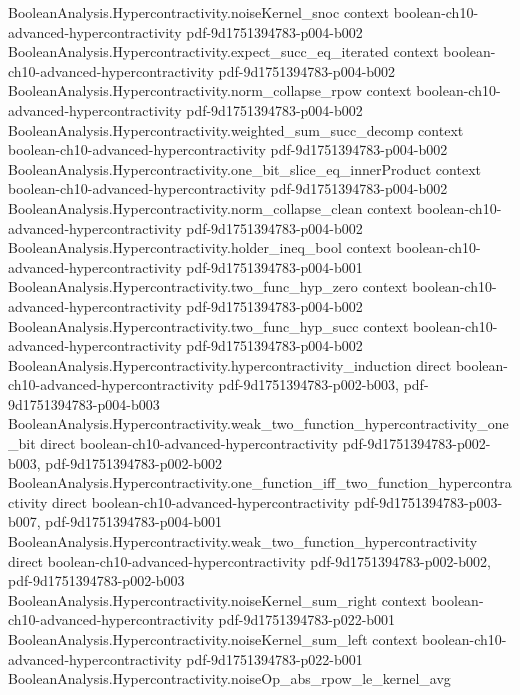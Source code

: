 \begin{theorem}
  {BooleanAnalysis.Hypercontractivity.noiseKernel_snoc}
  {context}
  {boolean-ch10-advanced-hypercontractivity}
  {pdf-9d1751394783-p004-b002}
\proofstep
  {BooleanAnalysis.Hypercontractivity.expect_succ_eq_iterated}
  {context}
  {boolean-ch10-advanced-hypercontractivity}
  {pdf-9d1751394783-p004-b002}
\proofstep
  {BooleanAnalysis.Hypercontractivity.norm_collapse_rpow}
  {context}
  {boolean-ch10-advanced-hypercontractivity}
  {pdf-9d1751394783-p004-b002}
\proofstep
  {BooleanAnalysis.Hypercontractivity.weighted_sum_succ_decomp}
  {context}
  {boolean-ch10-advanced-hypercontractivity}
  {pdf-9d1751394783-p004-b002}
\proofstep
  {BooleanAnalysis.Hypercontractivity.one_bit_slice_eq_innerProduct}
  {context}
  {boolean-ch10-advanced-hypercontractivity}
  {pdf-9d1751394783-p004-b002}
\proofstep
  {BooleanAnalysis.Hypercontractivity.norm_collapse_clean}
  {context}
  {boolean-ch10-advanced-hypercontractivity}
  {pdf-9d1751394783-p004-b002}
\proofstep
  {BooleanAnalysis.Hypercontractivity.holder_ineq_bool}
  {context}
  {boolean-ch10-advanced-hypercontractivity}
  {pdf-9d1751394783-p004-b001}
\proofstep
  {BooleanAnalysis.Hypercontractivity.two_func_hyp_zero}
  {context}
  {boolean-ch10-advanced-hypercontractivity}
  {pdf-9d1751394783-p004-b002}
\proofstep
  {BooleanAnalysis.Hypercontractivity.two_func_hyp_succ}
  {context}
  {boolean-ch10-advanced-hypercontractivity}
  {pdf-9d1751394783-p004-b002}
\proofstep
  {BooleanAnalysis.Hypercontractivity.hypercontractivity_induction}
  {direct}
  {boolean-ch10-advanced-hypercontractivity}
  {pdf-9d1751394783-p002-b003,
    pdf-9d1751394783-p004-b003}
\proofstep
  {BooleanAnalysis.Hypercontractivity.weak_two_function_hypercontractivity_one_bit}
  {direct}
  {boolean-ch10-advanced-hypercontractivity}
  {pdf-9d1751394783-p002-b003,
    pdf-9d1751394783-p002-b002}
\proofstep
  {BooleanAnalysis.Hypercontractivity.one_function_iff_two_function_hypercontractivity}
  {direct}
  {boolean-ch10-advanced-hypercontractivity}
  {pdf-9d1751394783-p003-b007,
    pdf-9d1751394783-p004-b001}
\proofstep
  {BooleanAnalysis.Hypercontractivity.weak_two_function_hypercontractivity}
  {direct}
  {boolean-ch10-advanced-hypercontractivity}
  {pdf-9d1751394783-p002-b002,
    pdf-9d1751394783-p002-b003}
\proofstep
  {BooleanAnalysis.Hypercontractivity.noiseKernel_sum_right}
  {context}
  {boolean-ch10-advanced-hypercontractivity}
  {pdf-9d1751394783-p022-b001}
\proofstep
  {BooleanAnalysis.Hypercontractivity.noiseKernel_sum_left}
  {context}
  {boolean-ch10-advanced-hypercontractivity}
  {pdf-9d1751394783-p022-b001}
\proofstep
  {BooleanAnalysis.Hypercontractivity.noiseOp_abs_rpow_le_kernel_avg}

\end{theorem}
